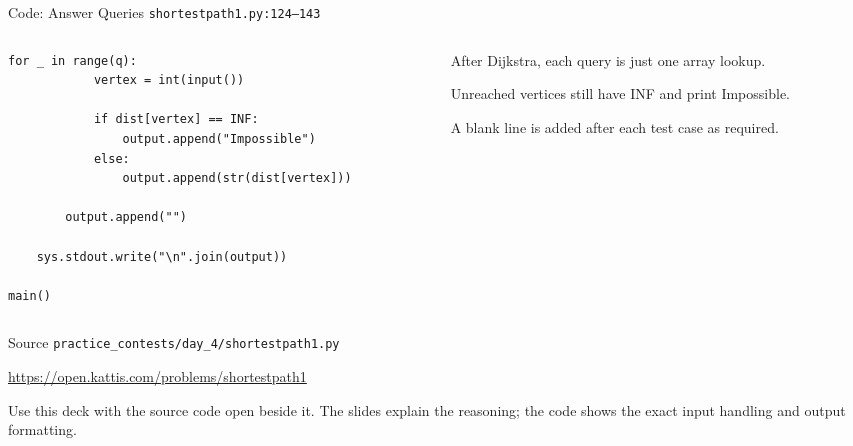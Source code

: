 \documentclass[aspectratio=169,11pt]{beamer}
\begin{document}
\begin{frame}[fragile]{Code: Answer Queries}
\scriptsize
{} \texttt{shortestpath1.py:124--143}

\vspace{0.08cm}
\begin{columns}[T,totalwidth=\textwidth]
\begin{column}{0.58\textwidth}
\begin{lstlisting}[style=cpcode]
        for _ in range(q):
            vertex = int(input())

            if dist[vertex] == INF:
                output.append("Impossible")
            else:
                output.append(str(dist[vertex]))

        output.append("")

    sys.stdout.write("\n".join(output))

main()
\end{lstlisting}
\end{column}
\begin{column}{0.38\textwidth}
\begin{tightitemize}
  \item After Dijkstra, each query is just one array lookup.
  \item Unreached vertices still have INF and print Impossible.
  \item A blank line is added after each test case as required.
\end{tightitemize}
\end{column}
\end{columns}
\end{frame}

\begin{frame}{Source}
\small
{} \texttt{practice\_contests/day\_4/shortestpath1.py}

\vspace{0.3cm}
 \url{https://open.kattis.com/problems/shortestpath1}

\vspace{0.45cm}
Use this deck with the source code open beside it. The slides explain the reasoning; the code shows the exact input handling and output formatting.
\end{frame}
\end{document}
